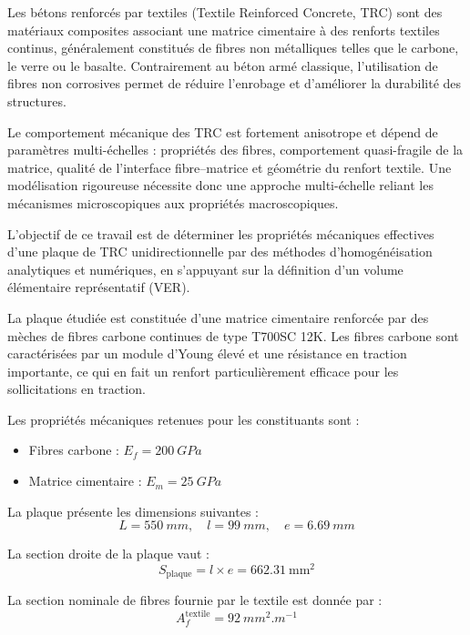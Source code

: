 \documentclass{rapportECL}
\begin{document}
Les bétons renforcés par textiles (Textile Reinforced Concrete, TRC) sont des matériaux composites associant une matrice cimentaire à des renforts textiles continus, généralement constitués de fibres non métalliques telles que le carbone, le verre ou le basalte. Contrairement au béton armé classique, l’utilisation de fibres non corrosives permet de réduire l’enrobage et d’améliorer la durabilité des structures.

Le comportement mécanique des TRC est fortement anisotrope et dépend de paramètres multi-échelles : propriétés des fibres, comportement quasi-fragile de la matrice, qualité de l’interface fibre--matrice et géométrie du renfort textile. Une modélisation rigoureuse nécessite donc une approche multi-échelle reliant les mécanismes microscopiques aux propriétés macroscopiques.

L’objectif de ce travail est de déterminer les propriétés mécaniques effectives d’une plaque de TRC unidirectionnelle par des méthodes d’homogénéisation analytiques et numériques, en s’appuyant sur la définition d’un volume élémentaire représentatif (VER).



La plaque étudiée est constituée d’une matrice cimentaire renforcée par des mèches de fibres carbone continues de type T700SC 12K. Les fibres carbone sont caractérisées par un module d’Young élevé et une résistance en traction importante, ce qui en fait un renfort particulièrement efficace pour les sollicitations en traction.

Les propriétés mécaniques retenues pour les constituants sont :
\begin{itemize}
    \item Fibres carbone : $E_f = \SI{200}{GPa}$
    \item Matrice cimentaire : $E_m = \SI{25}{GPa}$
\end{itemize}

La plaque présente les dimensions suivantes :
\[
L = \SI{550}{mm}, \quad l = \SI{99}{mm}, \quad e = \SI{6.69}{mm}
\]

La section droite de la plaque vaut :
\begin{equation}
S_{\text{plaque}} = l \times e = 662.31 \ \text{mm}^2
\end{equation}

La section nominale de fibres fournie par le textile est donnée par :
\[
A_f^{\text{textile}} = \SI{92}{mm^2.m^{-1}}
\]
\end{document}
